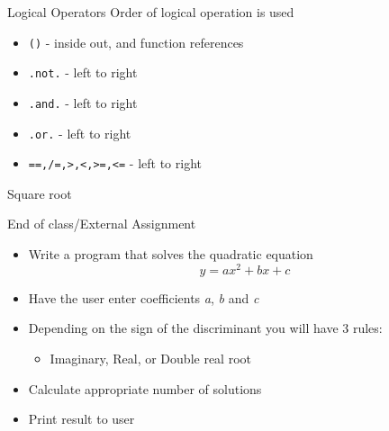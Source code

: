 \documentclass{beamer}
\begin{document}
\begin{frame}{Logical Operators}
     Order of logical operation is used
  \begin{itemize}
    \vfill\item \texttt{()} - inside out, and function references
    \vfill\item \texttt{.not.} - left to right
    \vfill\item \texttt{.and.} - left to right
    \vfill\item \texttt{.or.} - left to right
    \vfill\item \texttt{==,/=,>,<,>=,<=} - left to right
  \end{itemize}
\end{frame}
\begin{frame}[allowframebreaks]{Square root}
  \begin{scriptsize}
    
  \end{scriptsize}
\end{frame}
\begin{frame}{End of class/External Assignment}

  \begin{itemize}
    \item Write a program that solves the quadratic equation
    \begin{equation}
      \nonumber
       y = ax^{2} + bx + c 
    \end{equation}
    \vfill\item Have the user enter coefficients \emph{a}, \emph{b} and \emph{c}
    \vfill\item Depending on the sign of the discriminant you will have 3 rules:
    \begin{itemize}
      \vfill\item Imaginary, Real, or Double real root
    \end{itemize}
    \vfill\item Calculate appropriate number of solutions
    \vfill\item Print result to user
  \end{itemize}

\end{frame}
\end{document}
